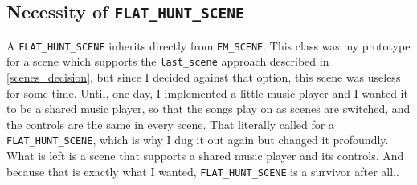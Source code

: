 \subsection{Necessity of \texttt{FLAT\_HUNT\_SCENE}}
A \texttt{FLAT\_HUNT\_SCENE} inherits directly from \texttt{EM\_SCENE}. This class was my prototype for a scene which supports the \texttt{last\_scene} approach described in \autoref{scenes_decision}, but since I decided against that option, this scene was useless for some time. Until, one day, I implemented a little music player and I wanted it to be a shared music player, so that the songs play on as scenes are switched, and the controls are the same in every scene. That literally called for a \texttt{FLAT\_HUNT\_SCENE}, which is why I dug it out again but changed it profoundly. What is left is a scene that supports a shared music player and its controls. And because that is exactly what I wanted, \texttt{FLAT\_HUNT\_SCENE} is a survivor after all..

